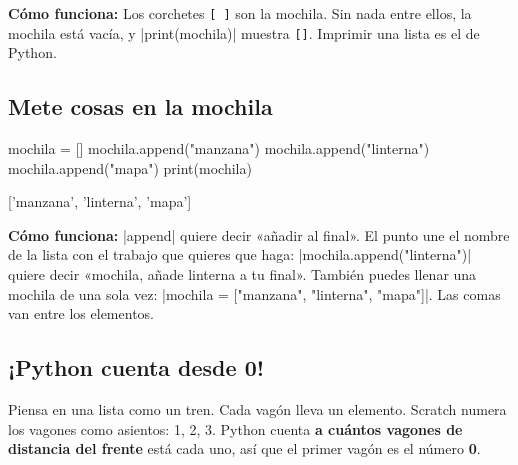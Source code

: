 \textbf{Cómo funciona:} Los corchetes \texttt{[ ]} son la mochila. Sin nada entre ellos, la mochila está vacía, y \py|print(mochila)| muestra \texttt{[]}. Imprimir una lista es el  de Python.

\subsection*{Mete cosas en la mochila}

\begin{tcbraster}[raster columns=2, raster equal height=rows, raster column skip=12pt, raster valign=center]
\begin{tcolorbox}[colback=white, colframe=white, boxrule=0pt, valign=center]
\begin{scratch}
\end{scratch}
\end{tcolorbox}
\begin{code}
mochila = []
mochila.append("manzana")
mochila.append("linterna")
mochila.append("mapa")
print(mochila)
\end{code}
\end{tcbraster}

\begin{outputbox}
{[}'manzana', 'linterna', 'mapa']
\end{outputbox}

\textbf{Cómo funciona:} \py|append| quiere decir «añadir al final». El punto une el nombre de la lista con el trabajo que quieres que haga: \py|mochila.append("linterna")| quiere decir «mochila, añade linterna a tu final». También puedes llenar una mochila de una sola vez: \py|mochila = ["manzana", "linterna", "mapa"]|. Las comas van entre los elementos.

\subsection*{¡Python cuenta desde 0!}

Piensa en una lista como un tren. Cada vagón lleva un elemento. Scratch numera los vagones como asientos: 1, 2, 3. Python cuenta \textbf{a cuántos vagones de distancia del frente} está cada uno, así que el primer vagón es el número \textbf{0}.

